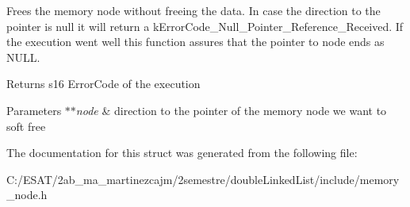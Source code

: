 Frees the memory node without freeing the data. In case the direction to the pointer is null it will return a k\+Error\+Code\+\_\+\+Null\+\_\+\+Pointer\+\_\+\+Reference\+\_\+\+Received. If the execution went well this function assures that the pointer to node ends as N\+U\+LL.

\begin{DoxyReturn}{Returns}
s16 Error\+Code of the execution 
\end{DoxyReturn}

\begin{DoxyParams}{Parameters}
{\em $\ast$$\ast$node} & direction to the pointer of the memory node we want to soft free \\
\hline
\end{DoxyParams}


The documentation for this struct was generated from the following file\+:\begin{DoxyCompactItemize}
\item 
C\+:/\+E\+S\+A\+T/2ab\+\_\+ma\+\_\+martinezcajm/2semestre/double\+Linked\+List/include/memory\+\_\+node.\+h\end{DoxyCompactItemize}
